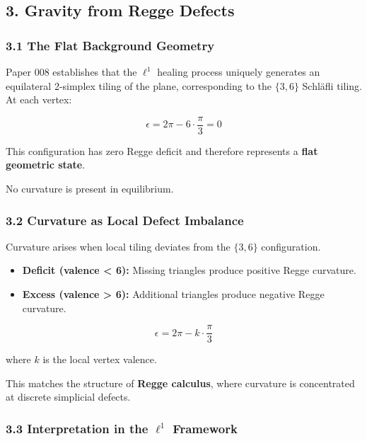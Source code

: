 \documentclass[
]{article}
\begin{document}
\hypertarget{gravity-from-regge-defects}{%
\subsection{3. Gravity from Regge
Defects}\label{gravity-from-regge-defects}}

\hypertarget{the-flat-background-geometry}{%
\subsubsection{3.1 The Flat Background
Geometry}\label{the-flat-background-geometry}}

Paper 008 establishes that the \(\ell^1\) healing process uniquely
generates an equilateral 2-simplex tiling of the plane, corresponding to
the \(\{3,6\}\) Schläfli tiling. At each vertex:

\[
\epsilon = 2\pi - 6 \cdot \frac{\pi}{3} = 0
\]

This configuration has zero Regge deficit and therefore represents a
\textbf{flat geometric state}.

No curvature is present in equilibrium.

\hypertarget{curvature-as-local-defect-imbalance}{%
\subsubsection{3.2 Curvature as Local Defect
Imbalance}\label{curvature-as-local-defect-imbalance}}

Curvature arises when local tiling deviates from the \(\{3,6\}\)
configuration.

\begin{itemize}
\item
  \textbf{Deficit (valence \textless{} 6):} Missing triangles produce
  positive Regge curvature.
\item
  \textbf{Excess (valence \textgreater{} 6):} Additional triangles
  produce negative Regge curvature.
\end{itemize}

\[
\epsilon = 2\pi - k \cdot \frac{\pi}{3}
\]

where \(k\) is the local vertex valence.

This matches the structure of \textbf{Regge calculus}, where curvature
is concentrated at discrete simplicial defects.

\hypertarget{interpretation-in-the-ell1-framework}{%
\subsubsection{\texorpdfstring{3.3 Interpretation in the \(\ell^1\)
Framework}{3.3 Interpretation in the \textbackslash ell\^{}1 Framework}}\label{interpretation-in-the-ell1-framework}}
\end{document}
